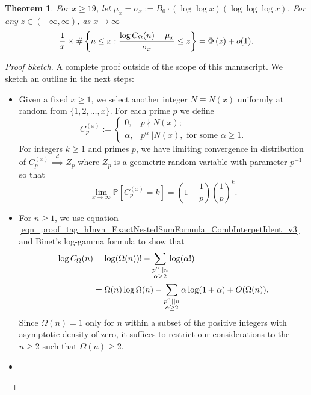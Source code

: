 \documentclass[11pt,reqno,a4letter]{article}
\numberwithin{equation}{section}
\numberwithin{figure}{section}
\numberwithin{table}{section}
\let\citep\cite
\theoremstyle{plain}
\newtheorem{theorem}{Theorem}
\numberwithin{theorem}{section}
\theoremstyle{definition}
\begin{document}
\begin{theorem}
\label{conj_DetFormOfEKTypeThmForCOmegan_v1} 
For $x \geq 19$, let $\mu_x = \sigma_x := B_0 \cdot (\log\log x)(\log\log\log x)$.
For any $z \in (-\infty, \infty)$, as $x \rightarrow \infty$ 
\begin{equation} 
\notag
\frac{1}{x} \times 
	\#\left\{n \leq x: \frac{\log C_{\Omega}(n) - \mu_x}{\sigma_x} \leq z\right\} = 
        \Phi\left(z\right) + o(1). 
\end{equation}
\end{theorem} 
\begin{proof}[Proof Sketch]
A complete proof outside of the scope of this manuscript. 
We sketch an outline in the next steps: 
\begin{itemize}[noitemsep,topsep=0pt,leftmargin=0.23in]
\item
Given a fixed $x \geq 1$, we select another integer $N \equiv N(x)$ uniformly at random from 
$\{1,2,\ldots,x\}$. For each prime $p$ we define 
\[
C_p^{(x)} := \begin{cases} 0, & p \nmid N(x); \\ 
	\alpha, & p^{\alpha} || N(x), \text{ for some } \alpha \geq 1. 
	\end{cases}
\]
For integers $k \geq 1$ and primes $p$, we have limiting convergence in distribution of 
$C_p^{(x)} \overset{d}{\implies} Z_p$ where $Z_p$ is 
a geometric random variable with parameter $p^{-1}$ so that 
\citep[\S 1.2]{LOG-COMB-STRUCTS-BOOK} 
\[
\lim_{x \rightarrow \infty} \mathbb{P}\left[C_p^{(x)} = k\right] = 
     \left(1 - \frac{1}{p}\right)\left(\frac{1}{p}\right)^k. 
\]
\item 
For $n \geq 1$, we use 
equation \eqref{eqn_proof_tag_hInvn_ExactNestedSumFormula_CombInterpetIdent_v3} and 
Binet's log-gamma formula \cite[\S 5.9(i)]{NISTHB} to show that 
\begin{align}
\notag
\log C_{\Omega}(n) & = \log (\Omega(n))! - 
	\sum_{\substack{p^{\alpha}||n \\ \alpha \geq 2}} \log(\alpha!) \\ 
\label{eqn_remark_LogCOmegan_IntermedExp_v1}
	& = \Omega(n) \log \Omega(n) - \sum_{\substack{p^{\alpha}||n \\ \alpha \geq 2}} 
	\alpha \log(1 + \alpha) + O(\Omega(n)). 
\end{align}
Since $\Omega(n) = 1$ only for $n$ within a subset of the positive 
integers with asymptotic density of zero, it suffices to restrict our considerations 
to the $n \geq 2$ such that $\Omega(n) \geq 2$. 
\item 

\end{itemize}
\end{proof}
\end{document}

